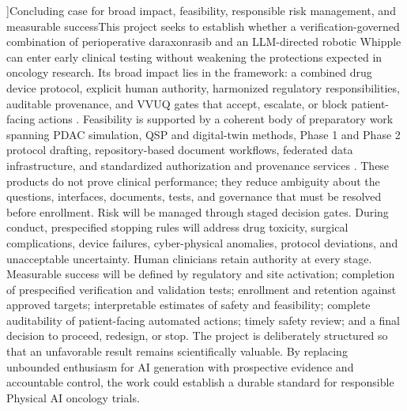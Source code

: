 {]{Concluding case for broad impact, feasibility, responsible risk management, and measurable success}{This project seeks to establish whether a verification-governed combination of perioperative daraxonrasib and an LLM-directed robotic Whipple can enter early clinical testing without weakening the protections expected in oncology research. Its broad impact lies in the framework: a combined drug device protocol, explicit human authority, harmonized regulatory responsibilities, auditable provenance, and VVUQ gates that accept, escalate, or block patient-facing actions \citep{phase1ind,onpremwhippl,clintrustpai,vvuqllmverif}. ^^J ^^JFeasibility is supported by a coherent body of preparatory work spanning PDAC simulation, QSP and digital-twin methods, Phase 1 and Phase 2 protocol drafting, repository-based document workflows, federated data infrastructure, and standardized authorization and provenance services \citep{qspmetpancre,fdadigtwinpc,phase1guidance,daraxwhipple,fedlearnpaio,natlmcpservr}. These ^^Jproducts do not prove clinical performance; they reduce ambiguity about the questions, interfaces, documents, tests, and governance that must be resolved before enrollment. Risk will be managed ^^Jthrough staged decision gates. During conduct, prespecified stopping rules will address drug toxicity, surgical complications, device failures, cyber-physical anomalies, protocol deviations, and unacceptable uncertainty. Human clinicians retain authority at every stage. ^^J ^^JMeasurable success will be defined by regulatory and site activation; completion of prespecified verification and validation tests; enrollment and retention against approved targets; interpretable ^^Jestimates of safety and feasibility; complete auditability of patient-facing automated actions; timely safety review; and a final decision to proceed, redesign, or stop. The project is deliberately structured so that an unfavorable result remains scientifically valuable. By replacing unbounded enthusiasm for AI generation with prospective evidence and accountable control, the work could establish a durable standard for responsible Physical AI oncology trials.
}
}
